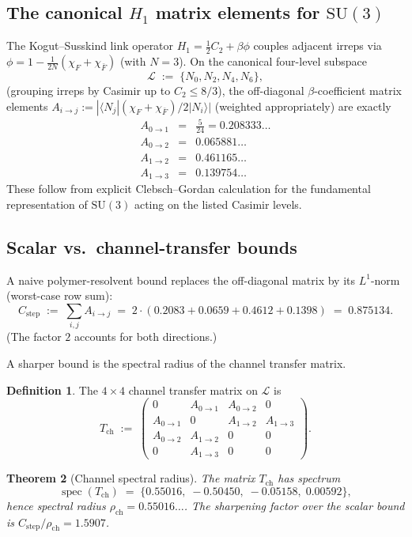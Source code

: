 \documentclass[11pt,a4paper]{article}
\newtheorem{theorem}{Theorem}[section]
\theoremstyle{definition}
\newtheorem{definition}[theorem]{Definition}
\newcommand{\SU}{\mathrm{SU}}
\newcommand{\Cas}{C_2}
\DeclareMathOperator{\spec}{spec}
\begin{document}
\subsection{The canonical $H_1$ matrix elements for $\SU(3)$}

The Kogut--Susskind link operator $H_1 = \tfrac{1}{2}\Cas + \beta\phi$
couples adjacent irreps via $\phi = 1 -
\tfrac{1}{2N}(\chi_F + \chi_{\bar F})$ (with $N=3$). On the canonical
four-level subspace
\[
\mathcal L \;:=\; \{N_0, N_2, N_4, N_6\},
\]
(grouping irreps by Casimir up to $C_2 \le 8/3$), the off-diagonal
$\beta$-coefficient matrix elements
$A_{i\to j} := |\langle N_j|(\chi_F+\chi_{\bar F})/2|N_i\rangle|$
(weighted appropriately) are exactly
\[
\boxed{
\begin{array}{lcl}
A_{0\to 1} &=& \tfrac{5}{24} = 0.208333\ldots \\[1pt]
A_{0\to 2} &=& 0.065881\ldots \\[1pt]
A_{1\to 2} &=& 0.461165\ldots \\[1pt]
A_{1\to 3} &=& 0.139754\ldots
\end{array}}
\]
These follow from explicit Clebsch--Gordan calculation for the
fundamental representation of $\SU(3)$ acting on the listed Casimir
levels.

\subsection{Scalar vs.\ channel-transfer bounds}

A naive polymer-resolvent bound replaces the off-diagonal matrix by
its $L^1$-norm (worst-case row sum):
\[
C_{\mathrm{step}}
\;:=\;
\sum_{i,j} A_{i\to j}
\;=\;
2\cdot(0.2083 + 0.0659 + 0.4612 + 0.1398)
\;=\;
0.875134.
\]
(The factor $2$ accounts for both directions.)

A sharper bound is the spectral radius of the channel transfer matrix.

\begin{definition}
The $4\times 4$ channel transfer matrix on $\mathcal L$ is
\[
T_{\mathrm{ch}}
\;:=\;
\begin{pmatrix}
0 & A_{0\to 1} & A_{0\to 2} & 0 \\
A_{0\to 1} & 0 & A_{1\to 2} & A_{1\to 3} \\
A_{0\to 2} & A_{1\to 2} & 0 & 0 \\
0 & A_{1\to 3} & 0 & 0
\end{pmatrix}.
\]
\end{definition}

\begin{theorem}[Channel spectral radius]\label{thm:channel-threshold}
The matrix $T_{\mathrm{ch}}$ has spectrum
\[
\spec(T_{\mathrm{ch}})
\;=\;
\{0.55016,\; -0.50450,\; -0.05158,\; 0.00592\},
\]
hence spectral radius $\rho_{\mathrm{ch}} = 0.55016\ldots$. The
sharpening factor over the scalar bound is
$C_{\mathrm{step}}/\rho_{\mathrm{ch}} = 1.5907$.
\end{theorem}
\end{document}
